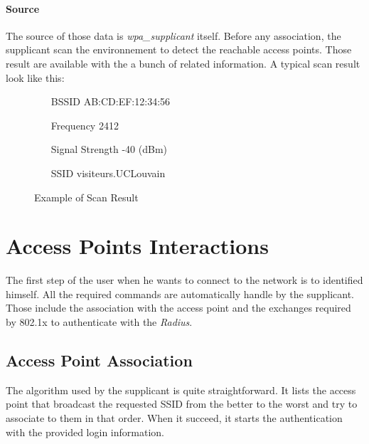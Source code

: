 \paragraph*{Source} The source of those data is \emph{wpa_supplicant} itself. Before any association, the supplicant scan the environnement to detect the reachable access points. Those result are available with the a bunch of related information. A typical scan result look like this:

\begin{figure}[H]
	\begin{itemize}
		\item[BSSID] AB:CD:EF:12:34:56
		\item[Frequency] 2412
		\item[Signal Strength] -40 (dBm)
		\item[SSID] visiteurs.UCLouvain
	\end{itemize}
	\caption{Example of Scan Result}
\end{figure}


\section{Access Points Interactions}
The first step of the user when he wants to connect to the network is to identified himself. All the required commands are automatically handle by the supplicant. Those include the association with the access point and the exchanges required by 802.1x to authenticate with the \emph{Radius}.

\subsection{Access Point Association}
The algorithm used by the supplicant is quite straightforward. It lists the access point that broadcast the requested SSID from the better to the worst and try to associate to them in that order. When it succeed, it starts the authentication with the provided login information.

